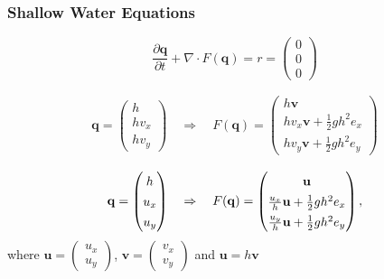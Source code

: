 \documentclass{beamer}
\newcommand{\pd}[2]{\dfrac{\partial #1}{\partial #2}}
\begin{document}

\begin{frame}
  \frametitle{Shallow Water Equations}
  \begin{equation}
    \label{eq:shallow-water-basic}
    \pd{\mathbf{q}}{t} + \nabla \cdot F(\mathbf{q}) = r = \begin{pmatrix}
      0 \\ 0\\ 0
    \end{pmatrix}
  \end{equation}

  \begin{eqnarray*}
    \mathbf{q} =
    \begin{pmatrix}
      h \\ h v_x \\ h v_y
    \end{pmatrix} \quad \Rightarrow \quad F(\mathbf{q}) =
    \begin{pmatrix}
      h \mathbf{v} \\ h v_x \mathbf{v} + \frac{1}{2} g h^2 e_x \\ h
      v_y \mathbf{v} + \frac{1}{2} g h^2 e_y
    \end{pmatrix}
  \end{eqnarray*}
 
  \begin{eqnarray*}
    \mathbf{q} =
    \begin{pmatrix}
      h \\ u_x \\ u_y
    \end{pmatrix} \quad \Rightarrow \quad F(\mathbf{q}) =
    {
      \renewcommand{\arraystretch}{1.35}
      \begin{pmatrix}
        \mathbf{u} \\ \frac{u_x}{h} \mathbf{u} + \frac{1}{2} g h^2 e_x \\ \frac{u_y}{h} \mathbf{u}+
        \frac{1}{2} g h^2 e_y
      \end{pmatrix},
    }
  \end{eqnarray*}
  where $\mathbf{u}=
  \begin{pmatrix}
    u_x \\ u_y
  \end{pmatrix}$, $\mathbf{v} =
  \begin{pmatrix}
    v_x \\ v_y
  \end{pmatrix}$ and $\mathbf{u} = h\mathbf{v}$
\end{frame}
\end{document}
